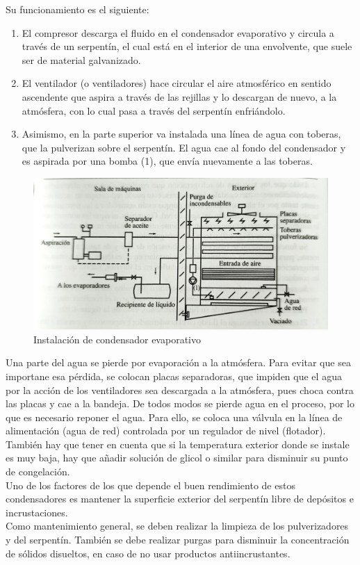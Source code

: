 Su funcionamiento es el siguiente:
\begin{enumerate}[1.]
    \item El compresor descarga el fluido en el condensador evaporativo y circula a trav\'es de un serpent\'in, el cual est\'a en el interior de una envolvente, que suele ser de material galvanizado.
    \item El ventilador (o ventiladores) hace circular el aire atmosf\'erico en sentido ascendente que aspira a trav\'es de las rejillas y lo descargan de nuevo, a la atm\'osfera, con lo cual pasa a trav\'es del serpent\'in enfri\'andolo.
    \item Asimismo, en la parte superior va instalada una l\'inea de agua con toberas, que la pulverizan sobre el serpent\'in. El agua cae al fondo del condensador y es aspirada por una bomba (1), que env\'ia nuevamente a las toberas.
\end{enumerate}
\begin{figure}[H]
    \centering
    \includegraphics[width=0.7\linewidth]{figuras/condensadores/condensador evaporativo.jpg}
    \caption{Instalaci\'on de condensador evaporativo}
    \label{fig:Instalaci\'on de condensador evaporativo}
\end{figure}

Una parte del agua se pierde por evaporaci\'on a la atm\'osfera. Para evitar que sea importane esa p\'erdida, se colocan placas separadoras, que impiden que el agua por la acci\'on de los ventiladores sea descargada a la atm\'osfera, pues choca contra las placas y cae a la bandeja. De todos modos se pierde agua en el proceso, por lo que es necesario reponer el agua. Para ello, se coloca una v\'alvula en la l\'inea de alimentaci\'on (agua de red) controlada por un regulador de nivel (flotador).\\Tambi\'en hay que tener en cuenta que si la temperatura exterior donde se instale es muy baja, hay que a\~{n}adir soluci\'on de glicol o similar para disminuir su punto de congelaci\'on.\\Uno de los factores de los que depende el buen rendimiento de estos condensadores es mantener la superficie exterior del serpent\'in libre de dep\'ositos e incrustaciones.\\Como mantenimiento general, se deben realizar la limpieza de los pulverizadores y del serpent\'in. Tambi\'en se debe realizar purgas para disminuir la concentraci\'on de s\'olidos disueltos, en caso de no usar productos antiincrustantes.


